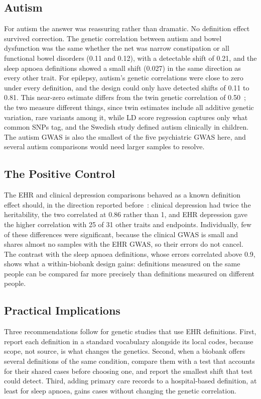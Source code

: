 \documentclass[conference]{IEEEtran}
\begin{document}
\subsection{Autism}
For autism the answer was reassuring rather than dramatic. No definition effect survived correction. The genetic correlation between autism and bowel dysfunction was the same whether the net was narrow constipation or all functional bowel disorders (0.11 and 0.12), with a detectable shift of 0.21, and the sleep apnoea definitions showed a small shift (0.027) in the same direction as every other trait. For epilepsy, autism's genetic correlations were close to zero under every definition, and the design could only have detected shifts of 0.11 to 0.81. This near-zero estimate differs from the twin genetic correlation of 0.50~\cite{pan2023}; the two measure different things, since twin estimates include all additive genetic variation, rare variants among it, while LD score regression captures only what common SNPs tag, and the Swedish study defined autism clinically in children. The autism GWAS is also the smallest of the five psychiatric GWAS here, and several autism comparisons would need larger samples to resolve.

\subsection{The Positive Control}
The EHR and clinical depression comparisons behaved as a known definition effect should, in the direction reported before~\cite{cai2020}: clinical depression had twice the heritability, the two correlated at 0.86 rather than 1, and EHR depression gave the higher correlation with 25 of 31 other traits and endpoints. Individually, few of these differences were significant, because the clinical GWAS is small and shares almost no samples with the EHR GWAS, so their errors do not cancel. The contrast with the sleep apnoea definitions, whose errors correlated above 0.9, shows what a within-biobank design gains: definitions measured on the same people can be compared far more precisely than definitions measured on different people.

\subsection{Practical Implications}
Three recommendations follow for genetic studies that use EHR definitions. First, report each definition in a standard vocabulary alongside its local codes, because scope, not source, is what changes the genetics. Second, when a biobank offers several definitions of the same condition, compare them with a test that accounts for their shared cases before choosing one, and report the smallest shift that test could detect. Third, adding primary care records to a hospital-based definition, at least for sleep apnoea, gains cases without changing the genetic correlation.
\end{document}
